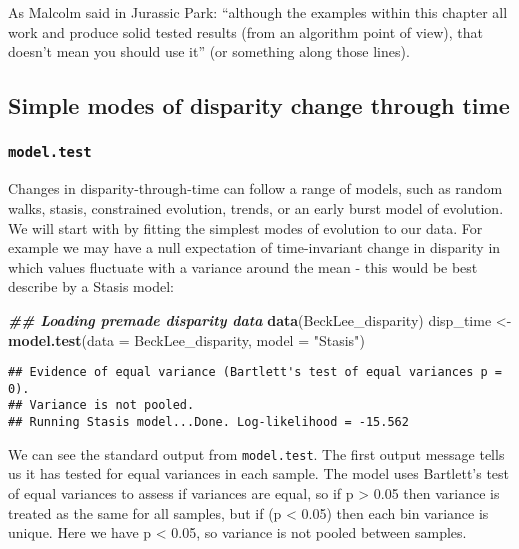 \documentclass[
]{book}
\newenvironment{Shaded}{\begin{snugshade}}{\end{snugshade}}
\newcommand{\AttributeTok}[1]{\textcolor[rgb]{0.13,0.29,0.53}{#1}}
\newcommand{\DocumentationTok}[1]{\textcolor[rgb]{0.56,0.35,0.01}{\textbf{\textit{#1}}}}
\newcommand{\FunctionTok}[1]{\textcolor[rgb]{0.13,0.29,0.53}{\textbf{#1}}}
\newcommand{\NormalTok}[1]{#1}
\newcommand{\OtherTok}[1]{\textcolor[rgb]{0.56,0.35,0.01}{#1}}
\newcommand{\StringTok}[1]{\textcolor[rgb]{0.31,0.60,0.02}{#1}}
\begin{document}
As Malcolm said in Jurassic Park: ``although the examples within this chapter all work and produce solid tested results (from an algorithm point of view), that doesn't mean you should use it'' (or something along those lines).

\hypertarget{simple-modes-of-disparity-change-through-time}{%
\subsection{Simple modes of disparity change through time}\label{simple-modes-of-disparity-change-through-time}}

\hypertarget{model.test}{%
\subsubsection{\texorpdfstring{\texttt{model.test}}{model.test}}\label{model.test}}

Changes in disparity-through-time can follow a range of models, such as random walks, stasis, constrained evolution, trends, or an early burst model of evolution.
We will start with by fitting the simplest modes of evolution to our data.
For example we may have a null expectation of time-invariant change in disparity in which values fluctuate with a variance around the mean - this would be best describe by a Stasis model:

\begin{Shaded}
\begin{Highlighting}[]
\DocumentationTok{\#\# Loading premade disparity data}
\FunctionTok{data}\NormalTok{(BeckLee\_disparity)}
\NormalTok{disp\_time }\OtherTok{\textless{}{-}} \FunctionTok{model.test}\NormalTok{(}\AttributeTok{data =}\NormalTok{ BeckLee\_disparity, }\AttributeTok{model =} \StringTok{"Stasis"}\NormalTok{)}
\end{Highlighting}
\end{Shaded}

\begin{verbatim}
## Evidence of equal variance (Bartlett's test of equal variances p = 0).
## Variance is not pooled.
## Running Stasis model...Done. Log-likelihood = -15.562
\end{verbatim}

We can see the standard output from \texttt{model.test}.
The first output message tells us it has tested for equal variances in each sample.
The model uses Bartlett's test of equal variances to assess if variances are equal, so if p \textgreater{} 0.05 then variance is treated as the same for all samples, but if (p \textless{} 0.05) then each bin variance is unique.
Here we have p \textless{} 0.05, so variance is not pooled between samples.
\end{document}
